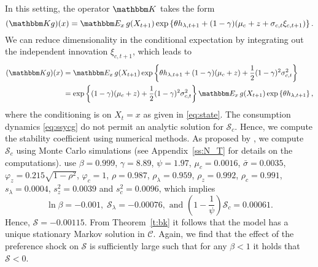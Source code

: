 \documentclass[12pt, reqno]{amsart}
\newcommand{\1}{\mathbbm 1}
\newcommand{\cC}{\mathscr C}
\newcommand{\sS}{\mathscr S}
\newcommand{\KK}{\mathbbm K}
\newcommand{\EE}{\mathbbm E}
\renewcommand{\phi}{\varphi}
\theoremstyle{plain}
\theoremstyle{definition}
\begin{document}
In this setting, the operator $\KK$ takes the form
%
\begin{equation*}
    (\KK g)(x)
    = \EE_x
        \, g(X_{t+1}) 
        \exp \left\{
            \theta h_{\lambda, t+1}
            + (1-\gamma)(\mu_c + z + \sigma_{c, t} \xi_{c, t+1})
        \right\}.
\end{equation*}
%
We can reduce dimensionality in the conditional expectation by integrating out
the independent innovation $\xi_{c, t+1}$, which leads to 
%
\begin{align*}
    (\KK g)(x)
    & = \EE_x \, g(X_{t+1}) 
        \exp \left\{
            \theta h_{\lambda, t+1}
            + (1-\gamma)(\mu_c + z)
            + \frac{1}{2} (1-\gamma)^2 \sigma_{c, t}^2 
        \right\}
        \\
    & = \exp \left\{
            (1-\gamma)(\mu_c + z)
            + \frac{1}{2} (1-\gamma)^2 \sigma_{c, t}^2 
        \right\}
        \EE_x \, g(X_{t+1}) 
        \exp \left\{
            \theta h_{\lambda, t+1}
        \right\},
\end{align*}
%
where the conditioning is on $X_t = x$ as given in \eqref{eq:state}. The
consumption dynamics \eqref{eq:ssycg} do not permit an analytic solution for
$\sS_c$. Hence, we compute the stability coefficient using numerical methods.
As proposed by \cite{borovicka2020necessary}, we compute $\sS_c$ using Monte
Carlo simulations (see Appendix~\ref{ss:N_T} for details on the computations).  \cite{schorfheide2018identifying} use $\beta = 0.999$, $\gamma = 8.89$, $\psi
=
1.97$, $\mu_c = 0.0016$, $\bar{\sigma} = 0.0035$, $\phi_z = 0.215 \sqrt{1 -
\rho^2}$, $\phi_c = 1$, $\rho = 0.987$, $\rho_\lambda = 0.959$, $\rho_z =
0.992$, $\rho_c = 0.991$, $s_\lambda = 0.0004$, $s_z^2 = 0.0039$ and $s_c^2 =
0.0096$, which implies
%
\begin{equation*}
    \ln \beta = -0.001,\; \sS_\lambda = -0.00076, \text{ and }
    \left(1-\frac{1}{\psi}\right) \sS_c = 0.00061.
\end{equation*}
%
Hence, $\sS = -0.00115$. From Theorem~\ref{t:bk} it follows that the model has
a unique stationary Markov solution in $\cC$. Again, we find that the effect
of the preference shock on $\sS$ is sufficiently large such that for any
$\beta < 1$ it holds that $\sS < 0$.  


\end{document}
